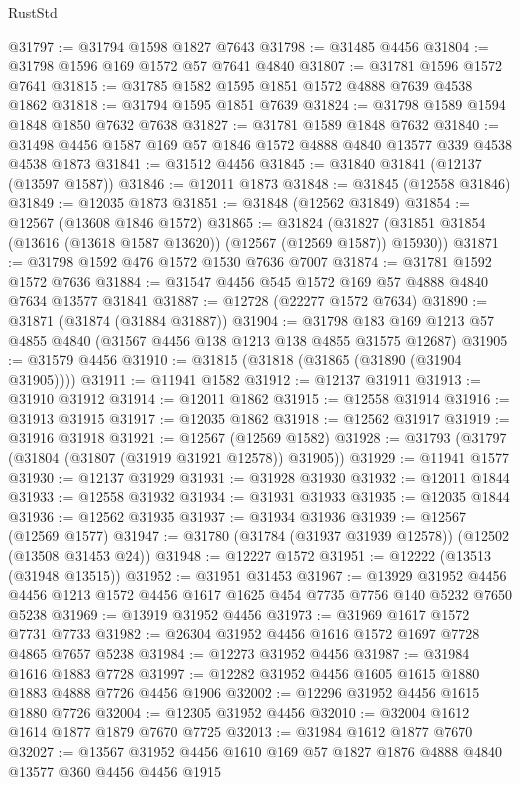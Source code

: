 \begin{lexlean}{RustStd}
\begin{coremodule}
@31797 := @31794 @1598 @1827 @7643
@31798 := @31485 @4456
@31804 := @31798 @1596 @169 @1572 @57 @7641 @4840
@31807 := @31781 @1596 @1572 @7641
@31815 := @31785 @1582 @1595 @1851 @1572 @4888 @7639 @4538 @1862
@31818 := @31794 @1595 @1851 @7639
@31824 := @31798 @1589 @1594 @1848 @1850 @7632 @7638
@31827 := @31781 @1589 @1848 @7632
@31840 := @31498 @4456 @1587 @169 @57 @1846 @1572 @4888 @4840 @13577 @339 @4538 @4538 @1873
@31841 := @31512 @4456
@31845 := @31840 @31841 (@12137 (@13597 @1587))
@31846 := @12011 @1873
@31848 := @31845 (@12558 @31846)
@31849 := @12035 @1873
@31851 := @31848 (@12562 @31849)
@31854 := @12567 (@13608 @1846 @1572)
@31865 := @31824
    (@31827 (@31851 @31854 (@13616 (@13618 @1587 @13620)) (@12567 (@12569 @1587)) @15930))
@31871 := @31798 @1592 @476 @1572 @1530 @7636 @7007
@31874 := @31781 @1592 @1572 @7636
@31884 := @31547 @4456 @545 @1572 @169 @57 @4888 @4840 @7634 @13577 @31841
@31887 := @12728 (@22277 @1572 @7634)
@31890 := @31871 (@31874 (@31884 @31887))
@31904 := @31798 @183 @169 @1213 @57 @4855 @4840 (@31567 @4456 @138 @1213 @138 @4855 @31575 @12687)
@31905 := @31579 @4456
@31910 := @31815 (@31818 (@31865 (@31890 (@31904 @31905))))
@31911 := @11941 @1582
@31912 := @12137 @31911
@31913 := @31910 @31912
@31914 := @12011 @1862
@31915 := @12558 @31914
@31916 := @31913 @31915
@31917 := @12035 @1862
@31918 := @12562 @31917
@31919 := @31916 @31918
@31921 := @12567 (@12569 @1582)
@31928 := @31793 (@31797 (@31804 (@31807 (@31919 @31921 @12578)) @31905))
@31929 := @11941 @1577
@31930 := @12137 @31929
@31931 := @31928 @31930
@31932 := @12011 @1844
@31933 := @12558 @31932
@31934 := @31931 @31933
@31935 := @12035 @1844
@31936 := @12562 @31935
@31937 := @31934 @31936
@31939 := @12567 (@12569 @1577)
@31947 := @31780 (@31784 (@31937 @31939 @12578)) (@12502 (@13508 @31453 @24))
@31948 := @12227 @1572
@31951 := @12222 (@13513 (@31948 @13515))
@31952 := @31951 @31453
@31967 := @13929
    @31952
    @4456
    @4456
    @1213
    @1572
    @4456
    @1617
    @1625
    @454
    @7735
    @7756
    @140
    @5232
    @7650
    @5238
@31969 := @13919 @31952 @4456
@31973 := @31969 @1617 @1572 @7731 @7733
@31982 := @26304 @31952 @4456 @1616 @1572 @1697 @7728 @4865 @7657 @5238
@31984 := @12273 @31952 @4456
@31987 := @31984 @1616 @1883 @7728
@31997 := @12282 @31952 @4456 @1605 @1615 @1880 @1883 @4888 @7726 @4456 @1906
@32002 := @12296 @31952 @4456 @1615 @1880 @7726
@32004 := @12305 @31952 @4456
@32010 := @32004 @1612 @1614 @1877 @1879 @7670 @7725
@32013 := @31984 @1612 @1877 @7670
@32027 := @13567 @31952 @4456 @1610 @169 @57 @1827 @1876 @4888 @4840 @13577 @360 @4456 @4456 @1915

\end{coremodule}
\end{lexlean}
